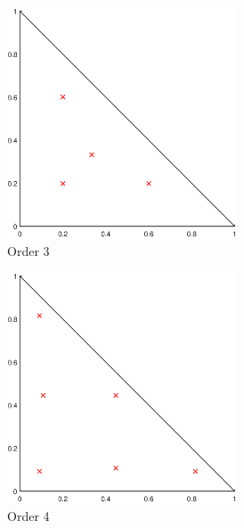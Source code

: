 \begin{figure}
{\begin{subfigure}[b]{0.475\textwidth}
		\centering
		\label{subfig::2DInt_RefTri_Q3}
		\includegraphics[width=0.75\textwidth]{figures/sec_BF/RefTriQuad_Q3.eps}
		\caption{Order 3}
	\end{subfigure}
	\hfill
	\begin{subfigure}[b]{0.475\textwidth}
		\centering
		\label{subfig::2DInt_RefTri_Q4}
		\includegraphics[width=0.75\textwidth]{figures/sec_BF/RefTriQuad_Q4.eps}
		\caption{Order 4}
	\end{subfigure}
}
\vspace{3mm}
{
	\begin{subfigure}[b]{0.475\textwidth}
		\centering
		\label{subfig::2DInt_RefTri_Q5}

\end{subfigure}}
\end{figure}
